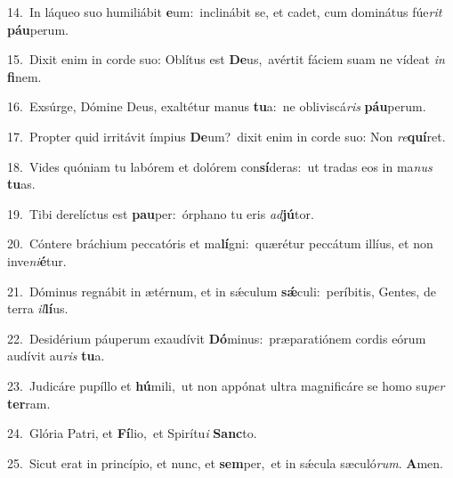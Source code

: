 {\numbfont\textcolor{\numbcolor}{14.}}~In láqueo suo humiliábit \textbf{e}\-um:~\star inclinábit se, et cadet, cum dominátus fúe\textit{rit} \textbf{páu}\-perum.\par
{\numbfont\textcolor{\numbcolor}{15.}}~Dixit enim in corde suo: Oblítus est \textbf{De}\-us,~\star avértit fáciem suam ne vídeat \textit{in} \textbf{fi}\-nem.\par
{\numbfont\textcolor{\numbcolor}{16.}}~Exsúrge, Dómine Deus, exaltétur manus \textbf{tu}\-a:~\star ne obliviscá\textit{ris} \textbf{páu}\-perum.\par
{\numbfont\textcolor{\numbcolor}{17.}}~Propter quid irritávit ímpius \textbf{De}\-um?~\star dixit enim in corde suo: Non \textit{re}\-\textbf{quí}ret.\par
{\numbfont\textcolor{\numbcolor}{18.}}~Vides quóniam tu labórem et dolórem con\-\textbf{sí}\-deras:~\star ut tradas eos in ma\textit{nus} \textbf{tu}\-as.\par
{\numbfont\textcolor{\numbcolor}{19.}}~Tibi derelíctus est \textbf{pau}\-per:~\star órphano tu eris \textit{ad}\-\textbf{jú}tor.\par
{\numbfont\textcolor{\numbcolor}{20.}}~Cóntere bráchium peccatóris et ma\-\textbf{lí}\-gni:~\star quærétur peccátum illíus, et non inve\-\textit{ni}\-\textbf{é}tur.\par
{\numbfont\textcolor{\numbcolor}{21.}}~Dóminus regnábit in ætérnum, et in sǽculum \textbf{sǽ}\-culi:~\star períbitis, Gentes, de terra \textit{il}\-\textbf{lí}us.\par
{\numbfont\textcolor{\numbcolor}{22.}}~Desidérium páuperum exaudívit \textbf{Dó}\-minus:~\star præparatiónem cordis eórum audívit au\textit{ris} \textbf{tu}\-a.\par
{\numbfont\textcolor{\numbcolor}{23.}}~Judicáre pupíllo et \textbf{hú}\-mili,~\star ut non appónat ultra magnificáre se homo su\textit{per} \textbf{ter}\-ram.\par
{\numbfont\textcolor{\numbcolor}{24.}}~Glória Patri, et \textbf{Fí}\-lio,~\star et Spirítu\textit{i} \textbf{Sanc}\-to.\par
{\numbfont\textcolor{\numbcolor}{25.}}~Sicut erat in princípio, et nunc, et \textbf{sem}\-per,~\star et in sǽcula sæculó\-\textit{rum}\-. \textbf{A}\-men.\par
